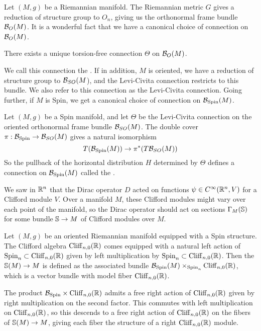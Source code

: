 Let $(M,g)$ be a Riemannian manifold. The Riemannian metric $G$ gives a
reduction of structure group to $O_n$, giving us the orthonormal frame bundle
$\B_O(M)$. It is a wonderful fact that we have a canonical choice of connection
on $\B_O(M)$.
%
\begin{thm}
There exists a unique torsion-free connection $\Theta$ on $\B_O(M)$.
\end{thm}
We call this connection the . If in addition,
$M$ is oriented, we have a reduction of structure group to $\B_{SO}(M$), and
the Levi-Civita connection restricts to this bundle. We also refer to this
connection as the Levi-Civita connection. Going further, if $M$ is Spin,
we get a canonical choice of connection on $\B_{\Spin}(M)$.
%
\begin{defn}
Let $(M,g)$ be a Spin manifold, and let $\Theta$ be the Levi-Civita connection
on the oriented orthonormal frame bundle $\B_{SO}(M)$. The double cover
$\pi : \B_{\Spin} \to \B_{SO}(M)$ gives a natural isomorphism
\[
T(\B_{\Spin}(M)) \to \pi^*(T\B_{SO}(M))
\]
So the pullback of the horizontal distribution $H$ determined by $\Theta$
defines a connection on $\B_{\Spin}(M)$ called the .
\end{defn}
%
We saw in $\R^n$ that the Dirac operator $D$ acted on functions
$\psi \in C^\infty(\R^n, V)$ for a Clifford module $V$. Over a manifold $M$,
these Clifford modules might vary over each point of the manifold, so the
Dirac operator should act on sections $\Gamma_M(\S)$ for some bundle $\S \to M$
of Clifford modules over $M$.
%
\begin{defn}
Let $(M,g)$ be an oriented Riemannian manifold equipped with a Spin structure.
The Clifford algebra $\Cliff_{n,0}(\R)$ comes equipped with a natural left
action of $\Spin_n \subset \Cliff_{n,0}(\R)$ given by left multiplication by
$\Spin_n \subset \Cliff_{n,0}(\R)$. Then the  $\S(M) \to M$ is
defined as the associated bundle $\B_{\Spin}(M) \times_{\Spin_n} \Cliff_{n,0}(\R)$,
which is a vector bundle with model fiber $\Cliff_{n,0}(\R)$.
\end{defn}
%
The product $\B_{\Spin} \times \Cliff_{n,0}(\R)$ admits a free right action of
$\Cliff_{n,0}(\R)$ given by right multiplication on the second factor. This
commutes with left multiplication on $\Cliff_{n,0}(\R)$, so this descends to a
free right action of $\Cliff_{n,0}(\R)$ on the fibers of $\S(M) \to M$, giving
each fiber the structure of a right $\Cliff_{n,0}(\R)$ module.
